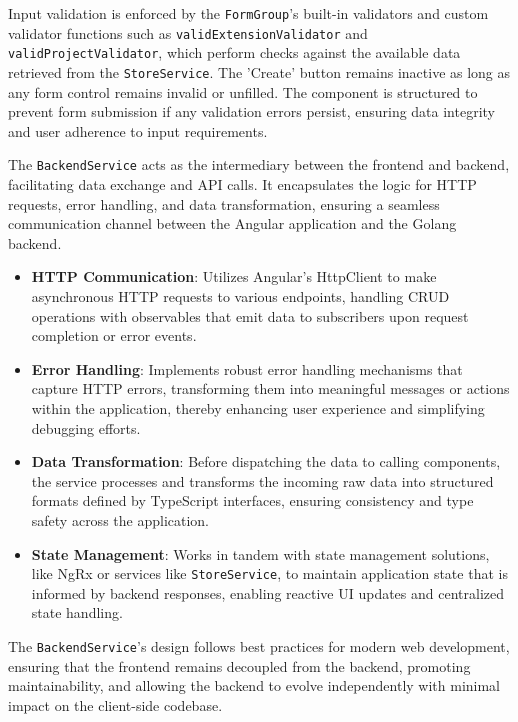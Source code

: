 Input validation is enforced by the \texttt{FormGroup}'s built-in validators and custom validator functions such as \texttt{validExtensionValidator} and \\\texttt{validProjectValidator}, which perform checks against the available data retrieved from the \texttt{StoreService}.
The 'Create' button remains inactive as long as any form control remains invalid or unfilled.
The component is structured to prevent form submission if any validation errors persist, ensuring data integrity and user adherence to input requirements.

The \texttt{BackendService} acts as the intermediary between the frontend and backend, facilitating data exchange and API calls.
It encapsulates the logic for HTTP requests, error handling, and data transformation, ensuring a seamless communication channel between the Angular application and the Golang backend.

\begin{itemize}
    \item \textbf{HTTP Communication}: Utilizes Angular's HttpClient to make asynchronous HTTP requests to various endpoints, handling CRUD operations with observables that emit data to subscribers upon request completion or error events.
    \item \textbf{Error Handling}: Implements robust error handling mechanisms that capture HTTP errors, transforming them into meaningful messages or actions within the application, thereby enhancing user experience and simplifying debugging efforts.
    \item \textbf{Data Transformation}: Before dispatching the data to calling components, the service processes and transforms the incoming raw data into structured formats defined by TypeScript interfaces, ensuring consistency and type safety across the application.
    \item \textbf{State Management}: Works in tandem with state management solutions, like NgRx or services like \texttt{StoreService}, to maintain application state that is informed by backend responses, enabling reactive UI updates and centralized state handling.
\end{itemize}

The \texttt{BackendService}'s design follows best practices for modern web development, ensuring that the frontend remains decoupled from the backend, promoting maintainability, and allowing the backend to evolve independently with minimal impact on the client-side codebase.


